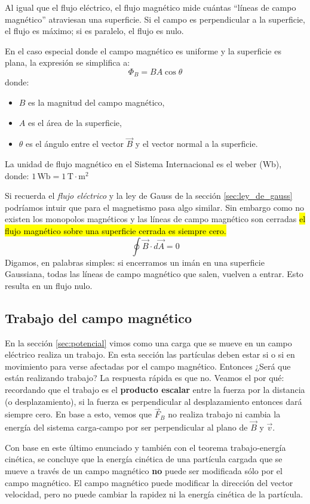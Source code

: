 Al igual que el flujo eléctrico, el flujo magnético mide cuántas ``líneas de campo magnético'' atraviesan una superficie. Si el campo es perpendicular a la superficie, el flujo es máximo; si es paralelo, el flujo es nulo.

En el caso especial donde el campo magnético es uniforme y la superficie es plana, la expresión se simplifica a:
\[
\Phi_B = B A \cos\theta
\]
donde:
\begin{itemize}
  \item \(B\) es la magnitud del campo magnético,
  \item \(A\) es el área de la superficie,
  \item \(\theta\) es el ángulo entre el vector \(\vec{B}\) y el vector normal a la superficie.
\end{itemize}

La unidad de flujo magnético en el Sistema Internacional es el weber (Wb), donde: \(1 \, \text{Wb} = 1 \, \text{T} \cdot \text{m}^2\)

Si recuerda el \textit{flujo eléctrico} y la ley de Gauss de la sección \ref{sec:ley_de_gauss} podríamos intuir que para el magnetismo pasa algo similar. Sin embargo como no existen los monopolos magnéticos y las líneas de campo magnético son cerradas \hl{el flujo magnético sobre una superficie cerrada es siempre cero.}
\[
\oint \vec{B}\cdot d\vec{A} = 0
\]
Digamos, en palabras simples: si encerramos un imán en una superficie Gaussiana, todas las líneas de campo magnético que salen, vuelven a entrar. Esto resulta en un flujo nulo.

\subsection{Trabajo del campo magnético}

En la sección \ref{sec:potencial} vimos como una carga que se mueve en un campo eléctrico realiza un trabajo. En esta sección las partículas deben estar si o si en movimiento para verse afectadas por el campo magnético. Entonces ¿Será que están realizando trabajo? La respuesta rápida es que no. Veamos el por qué: recordando que el trabajo es el \textbf{producto escalar} entre la fuerza por la distancia (o desplazamiento), si la fuerza es perpendicular al desplazamiento entonces dará siempre cero.
En base a esto, vemos que \(\vec{F}_B\) no realiza trabajo ni cambia la energía del sistema carga-campo por ser perpendicular al plano de \(\vec{B}\) y \(\vec{v}\). 

\begin{tcolorbox}[myconclusion]
  Con base en este último enunciado y también con el teorema trabajo-energía cinética, se concluye que la energía cinética de una partícula cargada que se mueve a través de un campo magnético \textbf{no} puede ser modificada sólo por el campo magnético. El campo magnético puede modificar la dirección del vector velocidad, pero no puede cambiar la rapidez ni la energía cinética de la partícula.
\end{tcolorbox}

